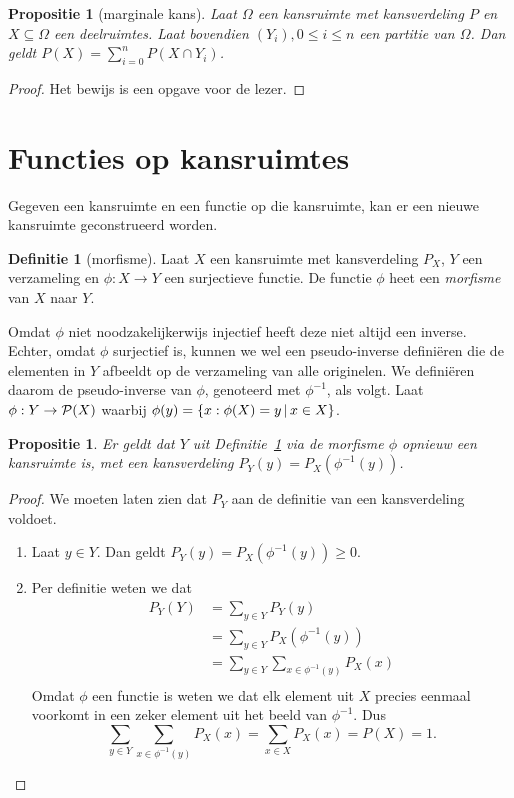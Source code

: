 \documentclass[a4paper]{book}
\newtheorem{proposition}[theorem]{Propositie}
\theoremstyle{definition}
\newtheorem{definition}[theorem]{Definitie}
\begin{document}
\begin{proposition}[marginale kans]
    Laat $\Omega$ een kansruimte met kansverdeling $P$ en $X \subseteq \Omega$ een deelruimtes.
    Laat bovendien $(Y_i), 0 \leq i \leq n$ een partitie van $\Omega$.
    Dan geldt $P(X) = \sum_{i=0}^n P(X \cap Y_i)$.
\end{proposition}
\begin{proof}
    Het bewijs is een opgave voor de lezer.
\end{proof}


\section{Functies op kansruimtes}
Gegeven een kansruimte en een functie op die kansruimte, kan er een nieuwe kansruimte geconstrueerd worden.

\begin{definition}[morfisme]\label{morfisme}
    Laat $X$ een kansruimte met kansverdeling $P_X$, $Y$ een verzameling en $\phi : X \to Y$ een surjectieve functie.
    De functie $\phi$ heet een \emph{morfisme} van $X$ naar $Y$.

    Omdat $\phi$ niet noodzakelijkerwijs injectief heeft deze niet altijd een inverse.
    Echter, omdat $\phi$ surjectief is, kunnen we wel een pseudo-inverse defini\"eren die de elementen in $Y$ afbeeldt op de verzameling van alle originelen.
    We defini\"eren daarom de pseudo-inverse van $\phi$, genoteerd met $\phi^{-1}$, als volgt.
    Laat $\phi : Y \to \powerset{X}$ waarbij $\phi(y) = \set{x : \phi(X) = y}{x \in X}$.
\end{definition}

\begin{proposition}
    Er geldt dat $Y$ uit Definitie~\ref{morfisme} via de morfisme $\phi$ opnieuw een kansruimte is, met een kansverdeling $P_Y(y) = P_X(\phi^{-1}(y))$.
\end{proposition}
\begin{proof}
    We moeten laten zien dat $P_Y$ aan de definitie van een kansverdeling voldoet.

    \begin{enumerate}[i]
        \item Laat $y \in Y$. Dan geldt $P_Y(y) =  P_X(\phi^{-1}(y)) \geq 0$.
        \item Per definitie weten we dat
        \begin{align*}
            P_Y(Y) &= \sum_{y \in Y} P_Y(y) \\
                   &= \sum_{y \in Y} P_X(\phi^{-1}(y)) \\
                   &= \sum_{y \in Y} \sum_{x \in \phi^{-1}(y)} P_X(x) \\
        \end{align*}
        Omdat $\phi$ een functie is weten we dat elk element uit $X$ precies eenmaal voorkomt in een zeker element uit het beeld van $\phi^{-1}$.
        Dus \[ \sum_{y \in Y} \sum_{x \in \phi^{-1}(y)} P_X(x) = \sum_{x \in X} P_X(x) = P(X) = 1. \]
    \end{enumerate}
\end{proof}
\end{document}
